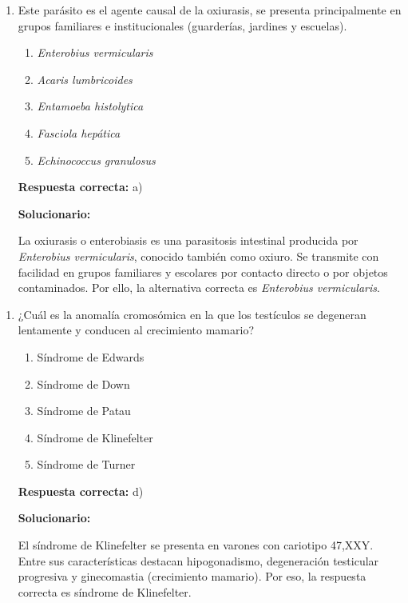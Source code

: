 \begin{enumerate}
	
	\item Este parásito es el agente causal de la oxiurasis, se presenta principalmente en grupos familiares e institucionales (guarderías, jardines y escuelas).
	
	\begin{enumerate}[label=\alph*)]
		\item \textit{Enterobius vermicularis}
		\item \textit{Acaris lumbricoides}
		\item \textit{Entamoeba histolytica}
		\item \textit{Fasciola hepática}
		\item \textit{Echinococcus granulosus}
	\end{enumerate}
	
	\textbf{Respuesta correcta:} a)
	
	\vspace{2mm}
	\textbf{Solucionario:}
	
	La oxiurasis o enterobiasis es una parasitosis intestinal producida por \textit{Enterobius vermicularis}, conocido también como oxiuro. Se transmite con facilidad en grupos familiares y escolares por contacto directo o por objetos contaminados. Por ello, la alternativa correcta es \textit{Enterobius vermicularis}.
	
\end{enumerate}


\begin{enumerate}[resume]
	
	\item ¿Cuál es la anomalía cromosómica en la que los testículos se degeneran lentamente y conducen al crecimiento mamario?
	
	\begin{enumerate}[label=\alph*)]
		\item Síndrome de Edwards
		\item Síndrome de Down
		\item Síndrome de Patau 
		\item Síndrome de Klinefelter
		\item Síndrome de Turner
	\end{enumerate}
	
	\textbf{Respuesta correcta:} d)
	
	\vspace{2mm}
	\textbf{Solucionario:}
	
	El síndrome de Klinefelter se presenta en varones con cariotipo 47,XXY. Entre sus características destacan hipogonadismo, degeneración testicular progresiva y ginecomastia (crecimiento mamario). Por eso, la respuesta correcta es síndrome de Klinefelter.
	
\end{enumerate}

